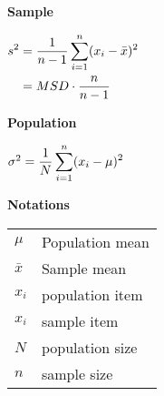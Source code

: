 \begin{table}[H]
\begin{minipage}[t]{0.25\linewidth}

\textbf{Sample}\label{Data/Describing Data/Central Tendency/Variance/sample} \cite{statistics/book/Statistics-for-Data-Scientists/Maurits-Kaptein}

\vspace{0.3cm}

$
    \begin{aligned}
        s^2
        &= \dfrac{1}{n-1} \displaystyle\sum_{i=1}^{n} (x_i - \bar{x})^2 \\
        &= MSD \cdot \dfrac{n}{n-1}
    \end{aligned}
$

\end{minipage}
\hspace{0.3cm}
\vrule width 1pt
\hspace{0.3cm}
\begin{minipage}[t]{0.25\linewidth}

\textbf{Population}\label{Data/Describing Data/Central Tendency/Variance/population} \cite{statistics/book/Statistics-for-Data-Scientists/Maurits-Kaptein}

\vspace{0.3cm}

$
    \sigma^2
    = \dfrac{1}{N} \displaystyle\sum_{i=1}^{n} (x_i - \mu)^2
$

\end{minipage}
\hspace{0.3cm}
\vrule width 1pt
\hspace{0.3cm}
\begin{minipage}[t]{0.25\linewidth}

{\hfill\textbf{Notations}\hfill}

\begin{table}[H]
    \begin{tabular}{l l}
        $\mu$ & Population mean \\
        $\bar{x}$ & Sample mean \\
        $x_i$ & population item \\
        $x_i$ & sample item \\
        $N$ & population size \\
        $n$ & sample size \\
    \end{tabular}
\end{table}

\end{minipage}
\end{table}


